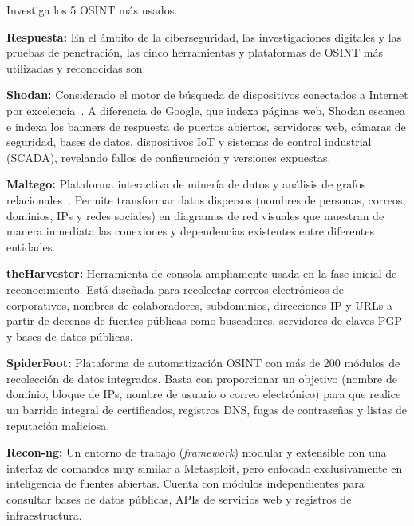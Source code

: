Investiga los 5 OSINT más usados.

\textbf{Respuesta:}
En el ámbito de la ciberseguridad, las investigaciones digitales y las pruebas de penetración, las cinco herramientas y plataformas de OSINT más utilizadas y reconocidas son:

\begin{enumerateColor}
    \item \textbf{Shodan:} Considerado el motor de búsqueda de dispositivos conectados a Internet por excelencia~\cite{shodan_guide}. A diferencia de Google, que indexa páginas web, Shodan escanea e indexa los banners de respuesta de puertos abiertos, servidores web, cámaras de seguridad, bases de datos, dispositivos IoT y sistemas de control industrial (SCADA), revelando fallos de configuración y versiones expuestas.
    \item \textbf{Maltego:} Plataforma interactiva de minería de datos y análisis de grafos relacionales~\cite{maltego_paterva}. Permite transformar datos dispersos (nombres de personas, correos, dominios, IPs y redes sociales) en diagramas de red visuales que muestran de manera inmediata las conexiones y dependencias existentes entre diferentes entidades.
    \item \textbf{theHarvester:} Herramienta de consola ampliamente usada en la fase inicial de reconocimiento. Está diseñada para recolectar correos electrónicos de corporativos, nombres de colaboradores, subdominios, direcciones IP y URLs a partir de decenas de fuentes públicas como buscadores, servidores de claves PGP y bases de datos públicas.
    \item \textbf{SpiderFoot:} Plataforma de automatización OSINT con más de 200 módulos de recolección de datos integrados. Basta con proporcionar un objetivo (nombre de dominio, bloque de IPs, nombre de usuario o correo electrónico) para que realice un barrido integral de certificados, registros DNS, fugas de contraseñas y listas de reputación maliciosa.
    \item \textbf{Recon-ng:} Un entorno de trabajo (\textit{framework}) modular y extensible con una interfaz de comandos muy similar a Metasploit, pero enfocado exclusivamente en inteligencia de fuentes abiertas. Cuenta con módulos independientes para consultar bases de datos públicas, APIs de servicios web y registros de infraestructura.
\end{enumerateColor}

